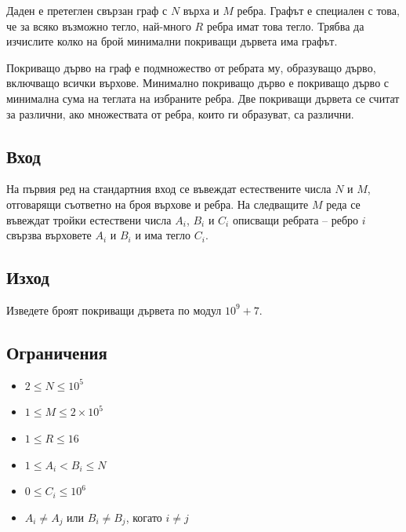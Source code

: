 \documentclass[12pt]{article}
\begin{document}
\renewcommand{\tl}{$2.2$ сек.}
\renewcommand{\ml}{$512$ MB}
\renewcommand{\header}{
    НАЦИОНАЛЕН ЛЕТЕН ТУРНИР ПО ИНФОРМАТИКА\\
    Пловдив, 6-8 юни 2025 г.\\
    Група A, 11-12 клас
}

Даден е претеглен свързан граф с $N$ върха и $M$ ребра.
Графът е специален с това, че за всяко възможно тегло, най-много $R$ ребра имат това тегло.
Трябва да изчислите колко на брой минимални покриващи дървета има графът.

Покриващо дърво на граф е подмножество от ребрата му, образуващо дърво, включващо всички върхове.
Минимално покриващо дърво е покриващо дърво с минимална сума на теглата на избраните ребра.
Две покриващи дървета се считат за различни, ако множествата от ребра, които ги образуват, са различни.

\subsection{Вход}
На първия ред на стандартния вход се въвеждат естествените числа $N$ и $M$, отговарящи съответно на броя върхове и ребра.
На следващите $M$ реда се въвеждат тройки естествени числа $A_i$, $B_i$ и $C_i$ описващи ребрата -- ребро $i$ свързва върховете $A_i$ и $B_i$ и има тегло $C_i$.

\subsection{Изход}
Изведете броят покриващи дървета по модул $10^9+7$.

\subsection{Ограничения}
\begin{itemize}
\item $2 \leq N \leq 10^5$
\item $1 \leq M \leq 2 \times 10^5$
\item $1 \leq R \leq 16$
\item $1 \leq A_i < B_i \leq N$
\item $0 \leq C_i \leq 10^6$
\item $A_i \neq A_j$ или $B_i \neq B_j$, когато $i \neq j$
\end{itemize}
\end{document}
